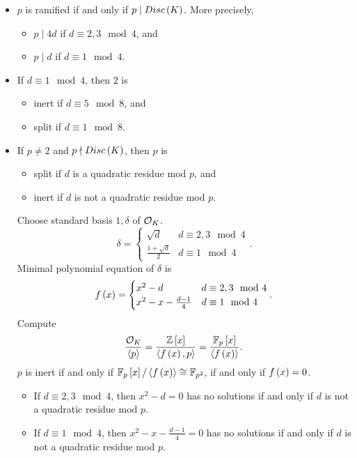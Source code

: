 \begin{itemize}
\item $ p $ is ramified if and only if $ p \mid Disc\left( K \right) $. More precisely,
\begin{itemize}
\item $ p \mid 4d $ if $ d \equiv 2, 3 \mod 4 $, and
\item $ p \mid d $ if $ d \equiv 1 \mod 4 $.
\end{itemize}
\item If $ d \equiv 1 \mod 4 $, then $ 2 $ is
\begin{itemize}
\item inert if $ d \equiv 5 \mod 8 $, and
\item split if $ d \equiv 1 \mod 8 $.
\end{itemize}
\item If $ p \ne 2 $ and $ p \nmid Disc\left( K \right) $, then $ p $ is
\begin{itemize}
\item split if $ d $ is a quadratic residue mod $ p $, and
\item inert if $ d $ is not a quadratic residue mod $ p $.
\end{itemize}
Choose standard basis $ 1, \delta $ of $ \mathcal{O}_K $.
$$ \delta =
\begin{cases}
\sqrt{d} & d \equiv 2, 3 \mod 4 \\
\tfrac{1 + \sqrt{d}}{2} & d \equiv 1 \mod 4
\end{cases}.
$$
Minimal polynomial equation of $ \delta $ is
$$ f\left( x \right) =
\begin{cases}
x^2 - d & d \equiv 2, 3 \mod 4 \\
x^2 - x - \tfrac{d - 1}{4} & d \equiv 1 \mod 4
\end{cases}.
$$
Compute
$$ \dfrac{\mathcal{O}_K}{\left\langle p \right\rangle} = \dfrac{\mathbb{Z}\left[ x \right]}{\left\langle f\left( x \right), p \right\rangle} = \dfrac{\mathbb{F}_p\left[ x \right]}{\left\langle f\left( x \right) \right\rangle}. $$
$ p $ is inert if and only if $ \mathbb{F}_p\left[ x \right] / \left\langle f\left( x \right) \right\rangle \cong \mathbb{F}_{p^2} $, if and only if $ f\left( x \right) = 0 $.
\begin{itemize}
\item If $ d \equiv 2, 3 \mod 4 $, then $ x^2 - d = 0 $ has no solutions if and only if $ d $ is not a quadratic residue mod $ p $.
\item If $ d \equiv 1 \mod 4 $, then $ x^2 - x - \tfrac{d - 1}{4} = 0 $ has no solutions if and only if $ d $ is not a quadratic residue mod $ p $.
\end{itemize}
\end{itemize}

\pagebreak

